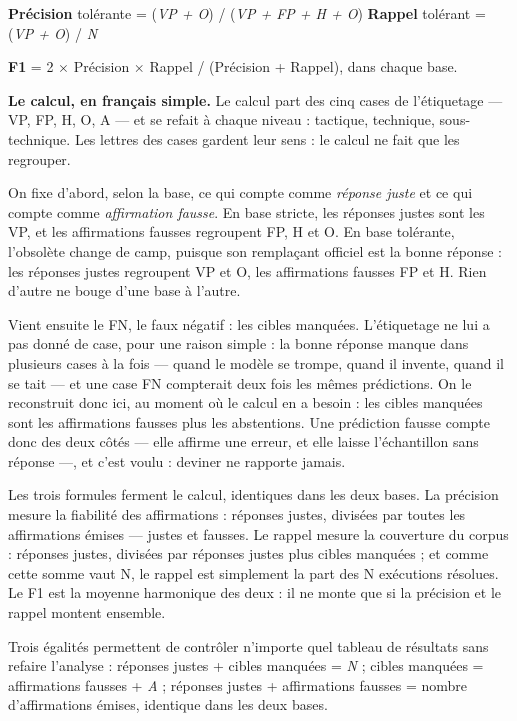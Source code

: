 \textbf{Précision} tolérante = (\emph{VP + O}) / (\emph{VP + FP + H + O}) \textbf{Rappel} tolérant = (\emph{VP + O}) / \emph{N}

\textbf{F1} = 2 $\times$ Précision $\times$ Rappel / (Précision + Rappel), dans chaque base.

\textbf{Le calcul, en français simple.} Le calcul part des cinq cases de l'étiquetage --- VP, FP, H, O, A --- et se refait à chaque niveau : tactique, technique, sous-technique. Les lettres des cases gardent leur sens : le calcul ne fait que les regrouper.

On fixe d'abord, selon la base, ce qui compte comme \emph{réponse juste} et ce qui compte comme \emph{affirmation fausse}. En base stricte, les réponses justes sont les VP, et les affirmations fausses regroupent FP, H et O. En base tolérante, l'obsolète change de camp, puisque son remplaçant officiel est la bonne réponse : les réponses justes regroupent VP et O, les affirmations fausses FP et H. Rien d'autre ne bouge d'une base à l'autre.

Vient ensuite le FN, le faux négatif : les cibles manquées. L'étiquetage ne lui a pas donné de case, pour une raison simple : la bonne réponse manque dans plusieurs cases à la fois --- quand le modèle se trompe, quand il invente, quand il se tait --- et une case FN compterait deux fois les mêmes prédictions. On le reconstruit donc ici, au moment où le calcul en a besoin : les cibles manquées sont les affirmations fausses plus les abstentions. Une prédiction fausse compte donc des deux côtés --- elle affirme une erreur, et elle laisse l'échantillon sans réponse ---, et c'est voulu : deviner ne rapporte jamais.

Les trois formules ferment le calcul, identiques dans les deux bases. La précision mesure la fiabilité des affirmations : réponses justes, divisées par toutes les affirmations émises --- justes et fausses. Le rappel mesure la couverture du corpus : réponses justes, divisées par réponses justes plus cibles manquées ; et comme cette somme vaut N, le rappel est simplement la part des N exécutions résolues. Le F1 est la moyenne harmonique des deux : il ne monte que si la précision et le rappel montent ensemble.

Trois égalités permettent de contrôler n'importe quel tableau de résultats sans refaire l'analyse : réponses justes + cibles manquées = \emph{N} ; cibles manquées = affirmations fausses + \emph{A} ; réponses justes + affirmations fausses = nombre d'affirmations émises, identique dans les deux bases.

